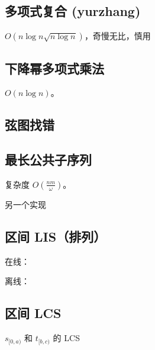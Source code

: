 \documentclass[12pt]{ctexart}
\begin{document}
\subsection{多项式复合 (yurzhang)}

$O(n\log n\sqrt{n\log n})$，奇慢无比，慎用



\subsection{下降幂多项式乘法}

$O(n\log n)$。



\subsection{弦图找错}



\subsection{最长公共子序列}

复杂度 $O(\frac{nm}{\omega})$。



另一个实现



\subsection{区间 LIS（排列）}

在线：





离线：



\subsection{区间 LCS}

$s_{[0,a)}$ 和 $t_{[b,c)}$ 的 LCS


\end{document}
